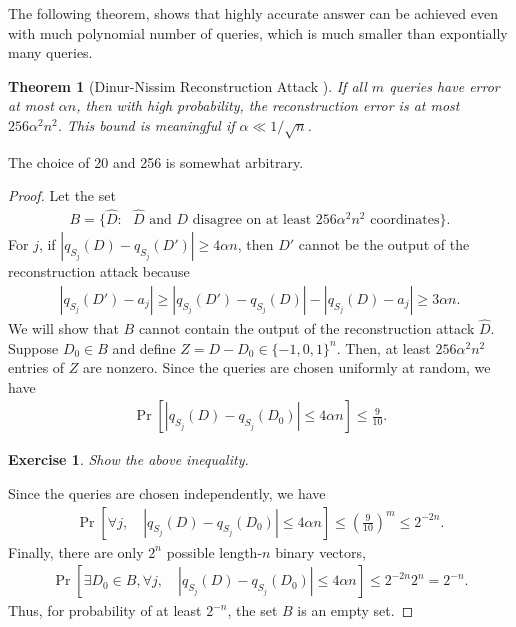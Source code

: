 \documentclass[11pt, a4paper]{article}
\newtheorem{theorem}{Theorem}
\newtheorem{exercise}{Exercise}
\begin{document}
The following theorem, shows that highly accurate answer can be achieved even with much polynomial number of queries, which is much smaller than expontially many queries.
\begin{theorem}[Dinur-Nissim Reconstruction Attack \cite{DinurNissim2003}]
    If all $m$ queries have error at most $\alpha n$, then with high probability,
    the reconstruction error is at most $256\alpha^2 n^2$.
    This bound is meaningful if $\alpha \ll 1/\sqrt{n}$.
\end{theorem}
The choice of 20 and 256 is somewhat arbitrary.
\begin{proof}
    Let the set
    \begin{align}
        B = \{\hat{D} : \mbox{ $\hat{D}$ and $D$ disagree on at least $256\alpha^2n^2$ coordinates}\}.
    \end{align}
    For $j$, if $|q_{S_j}(D) - q_{S_j}(D')| \geq 4\alpha n$, then $D'$ cannot be the output of the reconstruction attack because
    \begin{align}
        |q_{S_j}(D') - a_j| \geq |q_{S_j}(D') -q_{S_j}(D)| - |q_{S_j}(D) - a_j| \geq 3\alpha n.
    \end{align}
    We will show that $B$ cannot contain the output of the reconstruction attack $\hat{D}$.\\
    Suppose $D_0 \in B$ and define $Z = D - D_0 \in\{-1, 0, 1\}^n$.
    Then, at least $256\alpha^2 n^2$ entries of $Z$ are nonzero.
    Since the queries are chosen uniformly at random,  we have
    \begin{align}
        \Pr[|q_{S_j}(D) - q_{S_j}(D_0)| \leq 4\alpha n] \leq \frac{9}{10}.
    \end{align}
    \begin{exercise}
        Show the above inequality.
    \end{exercise}
    Since the queries are chosen independently, we have
    \begin{align}
        \Pr[\forall j, \quad |q_{S_j}(D) - q_{S_j}(D_0)| \leq 4\alpha n] \leq \left(\frac{9}{10}\right)^m\leq 2^{-2n}.
    \end{align}
    Finally, there are only $2^n$ possible length-$n$ binary vectors,
    \begin{align}
        \Pr[\exists D_0\in B, \forall j, \quad |q_{S_j}(D) - q_{S_j}(D_0)| \leq 4\alpha n] \leq 2^{-2n} 2^n = 2^{-n}.
    \end{align}
    Thus, for probability of at least $2^{-n}$, the set $B$ is an empty set.
\end{proof}
\end{document}
